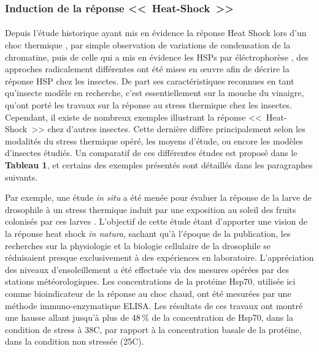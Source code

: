 		\subsubsection{Induction de la réponse <<~Heat-Shock~>>}
		\paragraph*{}


		Depuis l'étude historique ayant mis en évidence la réponse Heat Shock lors d'un choc thermique \cite{ritossa1996}, par simple observation de variations de condensation de la chromatine, puis de celle qui a mis en évidence les HSPs par éléctrophorèse \cite{tissieres1974}, des approches radicalement différentes ont été mises en \oe{}uvre afin de décrire la réponse HSP chez les  insectes.
		De part ses caractéristiques reconnues en tant qu'insecte modèle en recherche, c'est essentiellement sur la mouche du vinaigre,  qu'ont porté les travaux sur la réponse au stress thermique chez les insectes.
		Cependant, il existe de nombreux exemples illustrant la réponse <<~Heat-Shock~>> chez d'autres insectes.
		Cette dernière diffère principalement selon les modalités du stress thermique opéré, les moyens d'étude,  ou encore les modèles d'insectes étudiés.
		Un comparatif de ces différentes études est proposé dans le \textbf{Tableau 1}, et certains des exemples présentés sont détaillés dans les paragraphes suivants.


		Par exemple, une étude \textit{in situ} a été menée pour évaluer la réponse de la larve de drosophile à un stress thermique induit par une exposition au soleil des fruits colonisés par ces larves \cite{feder1997}.
		L'objectif de cette étude étant d'apporter une vision de la réponse heat shock \textit{in natura}, sachant qu'à l'époque de la publication, les recherches sur la physiologie et la biologie cellulaire de la drosophile se réduisaient presque exclusivement à des expériences en laboratoire.
		L'appréciation des niveaux d'ensoleillement a été effectuée via des mesures opérées par des stations météorologiques.
		Les concentrations de la protéine Hsp70, utilisée ici comme bioindicateur de la réponse au choc chaud, ont été mesurées par une méthode immuno-enzymatique ELISA. 
		Les résultats de ces travaux ont montré une hausse allant jusqu'à plus de 48\,\% de la concentration de Hsp70, dans la condition de stress à 38\textdegree{}C, par rapport à la concentration basale de la protéine, dans la condition non stressée (25\textdegree{}C).

